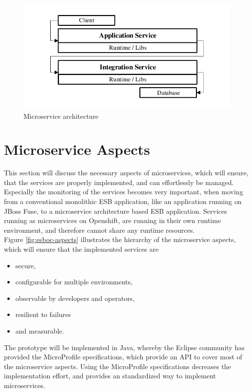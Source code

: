 \begin{figure}[htbp]
	\centering
	\includegraphics[scale=1]{images/esboc-design-microservice.pdf}
	\caption{Microservice architecture}
	\label{fig:esboc-design-services}
\end{figure}

\section{Microservice Aspects}
\label{sec:esboc-aspects}
This section will discuss the necessary aspects of microservices, which will ensure, that the services are properly implemented, and can effortlessly be managed. Especially the monitoring of the services becomes very important, when moving from a conventional monolithic ESB application, like an application running on JBoss Fuse, to a microservice architecture based ESB application. Services running as microservices on Openshift, are running in their own runtime environment, and therefore cannot share any runtime resources. \\

Figure \vref{fig:esboc-aspects} illustrates the hierarchy of the microservice aspects, which will ensure that the implemented services are
\begin{itemize}
	\item secure,
	\item configurable for multiple environments,
	\item observable by developers and operators,
	\item resilient to failures
	\item and measurable.
\end{itemize}

The prototype will be implemented in Java, whereby the Eclipse community has provided the MicroProfile specifications, which provide an API to cover most of the microservice aspects. Using the MicroProfile specifications decreases the implementation effort, and provides an standardized way to implement microservices\cite{EclipseMicroprofileCharter2017}. \\

